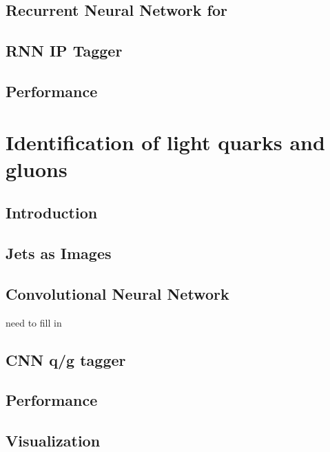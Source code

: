 \documentclass{report}
\begin{document}
\section{Recurrent Neural Network for \btagging}


\section{RNN IP Tagger}


\section{Performance}



\chapter{Identification of light quarks and gluons}
\label{chap:qgtagging}
\section{Introduction}


\section{Jets as Images}


\section{Convolutional Neural Network}
need to fill in

\section{CNN q/g tagger}


\section{Performance}


\section{Visualization}

\end{document}

